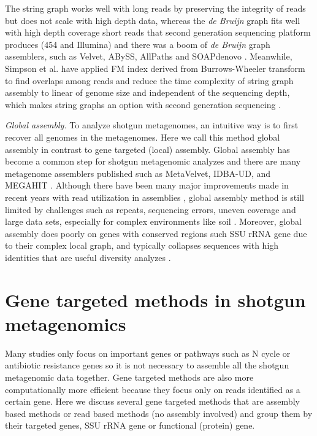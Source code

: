 \documentclass[]{msu-thesis}
\begin{document}
The string graph works well with long reads by preserving the
integrity of reads but does not scale with high depth data, whereas
the \textit{de Bruijn} graph fits well with high depth coverage short
reads that second generation sequencing platform produces (454 and
Illumina) and there was a boom of \textit{de Bruijn} graph assemblers,
such as Velvet, ABySS, AllPaths and SOAPdenovo
\cite{zerbino_velvet:_2008,simpson_abyss:_2009,butler_allpaths:_2008,luo_soapdenovo2:_2012}. Meanwhile,
Simpson et al. have applied FM index derived from Burrows-Wheeler
transform to find overlaps among reads and reduce the time complexity
of string graph assembly to linear of genome size and independent of
the sequencing depth, which makes string graphs an option with
second generation sequencing \cite{simpson_efficient_2012}.

\textit{Global assembly. } To analyze shotgun metagenomes, an
intuitive way is to first recover all genomes in the metagenomes. Here
we call this method global assembly in contrast to gene targeted
(local) assembly. Global assembly has become a common step for shotgun
metagenomic analyzes and there are many metagenome assemblers
published such as MetaVelvet, IDBA-UD, and MEGAHIT
\cite{li_megahit:_2015,namiki_metavelvet:_2012,peng_idba-ud:_2012}.
Although there have been many major improvements made in recent years with read utilization in assemblies
\cite{li_megahit:_2015}, global assembly method is still limited by
challenges such as repeats, sequencing errors, uneven coverage and
large data sets, especially for complex environments like soil
\cite{howe_tackling_2014}. Moreover, global assembly does poorly on
genes with conserved regions such SSU rRNA gene due to their complex
local graph, and typically collapses sequences with high identities
that are useful diversity analyzes
\cite{guo_microbial_2015,miller_emirge:_2011}.

\section{Gene targeted methods in shotgun metagenomics}

Many studies only focus on important genes or pathways such as N cycle
or antibiotic resistance genes so it is not necessary to assemble all
the shotgun metagenomic data together. Gene targeted methods are also
more computationally more efficient because they focus only on reads identified
as a certain gene. Here we discuss several gene targeted methods that
are assembly based methods or read based methods (no assembly
involved) and group them by their targeted genes, SSU rRNA gene or
functional (protein) gene.
\end{document}
